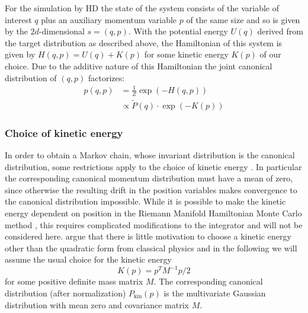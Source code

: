For the simulation by HD the state of the system consists of the variable of interest $q$ plus an auxiliary momentum variable $p$ of the same size and so is given by the $2d$-dimensional $s = (q, p)$. With the potential energy $U(q)$ derived from the target distribution as described above, the Hamiltonian of this system is given by $H(q, p) = U(q) + K(p)$ for some kinetic energy $K(p)$ of our choice. Due to the additive nature of this Hamiltonian the joint canonical distribution of $(q, p)$ factorizes:
\begin{equation}
\begin{split}
p(q, p) &= \frac{1}{Z} \exp \left( -H(q, p) \right) \\
			&\propto \tilde{P}(q) \cdot \exp{(-K(p))}
\end{split}
\end{equation}

\subsubsection{Choice of kinetic energy}
In order to obtain a Markov chain, whose invariant distribution is the canonical distribution, some restrictions apply to the choice of kinetic energy \parencite{Betancourt2014}. In particular the corresponding canonical momentum distribution must have a mean of zero, since otherwise the resulting drift in the position variables makes convergence to the canonical distribution impossible. While it is possible to make the kinetic energy dependent on position in the Riemann Manifold Hamiltonian Monte Carlo method \parencite{Girolami2011}, this requires complicated modifications to the integrator and will not be considered here. \textcite{Betancourt2014} argue that there is little motivation to choose a kinetic energy other than the quadratic form from classical physics and in the following we will assume the usual choice for the kinetic energy
\begin{equation} \label{eq:KineticEnergy}
K(p) = p^T M^{-1} p/2
\end{equation}
for some positive definite mass matrix $M$. The corresponding canonical distribution (after normalization) $P_\textrm{kin}(p)$ is the multivariate Gaussian distribution with mean zero and covariance matrix $M$.

